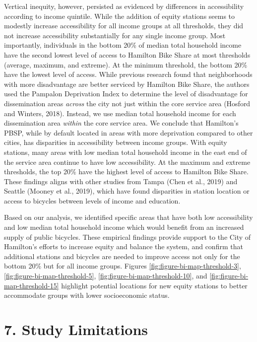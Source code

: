 \documentclass[]{elsarticle} %
\begin{document}
Vertical inequity, however, persisted as evidenced by differences in
accessibility according to income quintile. While the addition of equity
stations seems to modestly increase accessibility for all income groups
at all thresholds, they did not increase accessibility substantially for
any single income group. Most importantly, individuals in the bottom
20\% of median total household income have the second lowest level of
access to Hamilton Bike Share at most thresholds (average, maximum, and
extreme). At the minimum threshold, the bottom 20\% have the lowest
level of access. While previous research found that neighborhoods with
more disadvantage are better serviced by Hamilton Bike Share, the
authors used the Pampalon Deprivation Index to determine the level of
disadvantage for dissemination areas \emph{across} the city not just
within the core service area (Hosford and Winters, 2018). Instead, we
use median total household income for each dissemination area
\emph{within} the core service area. We conclude that Hamilton's PBSP,
while by default located in areas with more deprivation compared to
other cities, has disparities in accessibility between income groups.
With equity stations, many areas with low median total household income
in the east end of the service area continue to have low accessibility.
At the maximum and extreme thresholds, the top 20\% have the highest
level of access to Hamilton Bike Share. These findings aligns with other
studies from Tampa (Chen et al., 2019) and Seattle (Mooney et al.,
2019), which have found disparities in station location or access to
bicycles between levels of income and education.

Based on our analysis, we identified specific areas that have both low
accessibility and low median total household income which would benefit
from an increased supply of public bicycles. These empirical findings
provide support to the City of Hamilton's efforts to increase equity and
balance the system, and confirm that additional stations and bicycles
are needed to improve access not only for the bottom 20\% but for all
income groups. Figures \ref{fig:figure-bi-map-threshold-3},
\ref{fig:figure-bi-map-threshold-5},
\ref{fig:figure-bi-map-threshold-10}, and
\ref{fig:figure-bi-map-threshold-15} highlight potential locations for
new equity stations to better accommodate groups with lower
socioeconomic status.

\hypertarget{study-limitations}{%
\section{7. Study Limitations}\label{study-limitations}}
\end{document}

